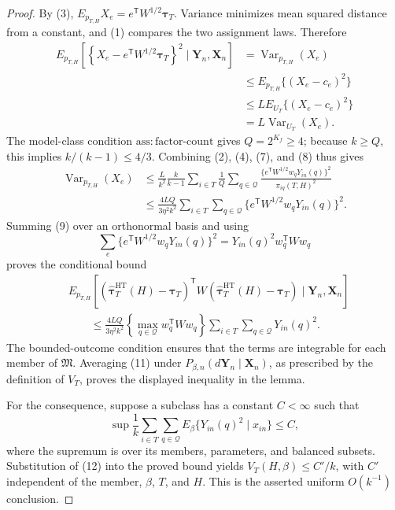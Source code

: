 \documentclass{article}
\begin{document}
\begin{proof}
By (3), \(E_{p_{T,H}}X_e=e^{\mathsf T}W^{1/2}\boldsymbol\tau_T\).  Variance minimizes mean squared distance from a constant, and (1) compares the two assignment laws.  Therefore
\[
\begin{aligned}
E_{p_{T,H}}\!\left[
\left\{X_e-e^{\mathsf T}W^{1/2}\boldsymbol\tau_T\right\}^2
\mid\mathbf Y_n,\mathbf X_n\right]
&=\operatorname{Var}_{p_{T,H}}(X_e)\\
&\leq E_{p_{T,H}}\{(X_e-c_e)^2\}\\
&\leq L E_{U_T}\{(X_e-c_e)^2\}\\
&=L\operatorname{Var}_{U_T}(X_e).
\end{aligned}
\tag{8}
\]
The model-class condition \(\mathrm{ass{:}factor\text{-}count}\) gives \(Q=2^{K_f}\geq4\); because \(k\geq Q\), this implies \(k/(k-1)\leq4/3\).  Combining (2), (4), (7), and (8) thus gives
\[
\begin{aligned}
\operatorname{Var}_{p_{T,H}}(X_e)
&\leq \frac{L}{k^2}\frac{k}{k-1}
\sum_{i\in T}\frac1Q\sum_{q\in\mathcal Q}
\frac{\{e^{\mathsf T}W^{1/2}w_qY_{in}(q)\}^2}{\pi_{iq}(T,H)^2}\\
&\leq \frac{4LQ}{3\eta^2k^2}
\sum_{i\in T}\sum_{q\in\mathcal Q}
\{e^{\mathsf T}W^{1/2}w_qY_{in}(q)\}^2.
\end{aligned}
\tag{9}
\]
Summing (9) over an orthonormal basis and using
\[
\sum_e\{e^{\mathsf T}W^{1/2}w_qY_{in}(q)\}^2
=Y_{in}(q)^2w_q^{\mathsf T}Ww_q
\tag{10}
\]
proves the conditional bound
\[
\begin{aligned}
&E_{p_{T,H}}\!\left[
(\widehat{\boldsymbol\tau}^{\mathrm{HT}}_T(H)-\boldsymbol\tau_T)^{\mathsf T}
W(\widehat{\boldsymbol\tau}^{\mathrm{HT}}_T(H)-\boldsymbol\tau_T)
\mid\mathbf Y_n,\mathbf X_n\right]\\
&\qquad\leq
\frac{4LQ}{3\eta^2k^2}
\left\{\max_{q\in\mathcal Q}w_q^{\mathsf T}Ww_q\right\}
\sum_{i\in T}\sum_{q\in\mathcal Q}Y_{in}(q)^2.
\end{aligned}
\tag{11}
\]
The bounded-outcome condition ensures that the terms are integrable for each member of \(\mathfrak M\).  Averaging (11) under \(P_{\beta,n}(d\mathbf Y_n\mid\mathbf X_n)\), as prescribed by the definition of \(V_T\), proves the displayed inequality in the lemma.

For the consequence, suppose a subclass has a constant \(C<\infty\) such that
\[
\sup\frac1k\sum_{i\in T}\sum_{q\in\mathcal Q}
E_\beta\{Y_{in}(q)^2\mid x_{in}\}\leq C,
\tag{12}
\]
where the supremum is over its members, parameters, and balanced subsets.  Substitution of (12) into the proved bound yields \(V_T(H,\beta)\leq C'/k\), with \(C'\) independent of the member, \(\beta\), \(T\), and \(H\).  This is the asserted uniform \(O(k^{-1})\) conclusion.


\end{proof}
\end{document}
